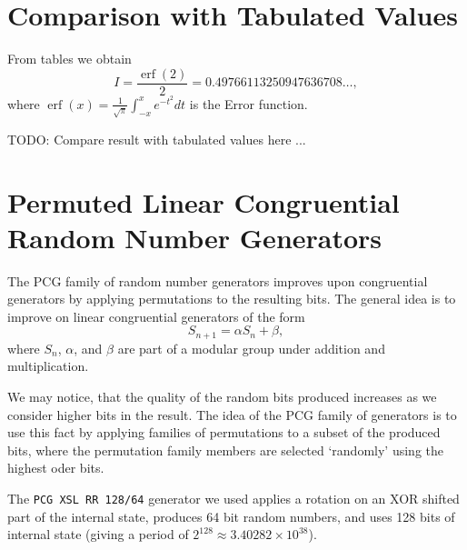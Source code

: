 \documentclass[10pt, a4paper]{article}
\begin{document}
{}


\appendix{}

\section{Comparison with Tabulated Values}
\label{app:cheat}
From tables we obtain
\begin{equation}
I = \frac{\operatorname{erf}(2)}{2} = 0.49766113250947636708 \dots,
\end{equation}
where $\operatorname{erf}(x) = \frac{1}{\sqrt\pi}\int_{-x}^x e^{-t^2} dt$ is the Error function.

TODO: Compare result with tabulated values here ...

\section{Permuted Linear Congruential Random Number Generators}
\label{app:pcg}

The PCG family of random number generators improves upon congruential generators by applying
permutations to the resulting bits\cite{pcg}. The general idea is to improve on linear congruential
generators of the form
\begin{equation}
S_{n+1} = \alpha S_n + \beta,
\end{equation}
where $S_n$, $\alpha$, and $\beta$ are part of a modular group under addition and multiplication.

We may notice, that the quality of the random bits produced increases as we consider higher bits
in the result\cite{pcg}. The idea of the PCG family of generators is to use this fact by
applying families of permutations to a subset of the produced bits, where the permutation family
members are selected `randomly' using the highest oder bits.

The \texttt{PCG XSL RR 128/64} generator we used applies a rotation on an XOR shifted part of the
internal state, produces 64 bit random numbers, and uses 128 bits of internal state (giving a
period of $2^{128} \approx 3.40282\times10^{38}$)\cite{pcg}.
\end{document}
